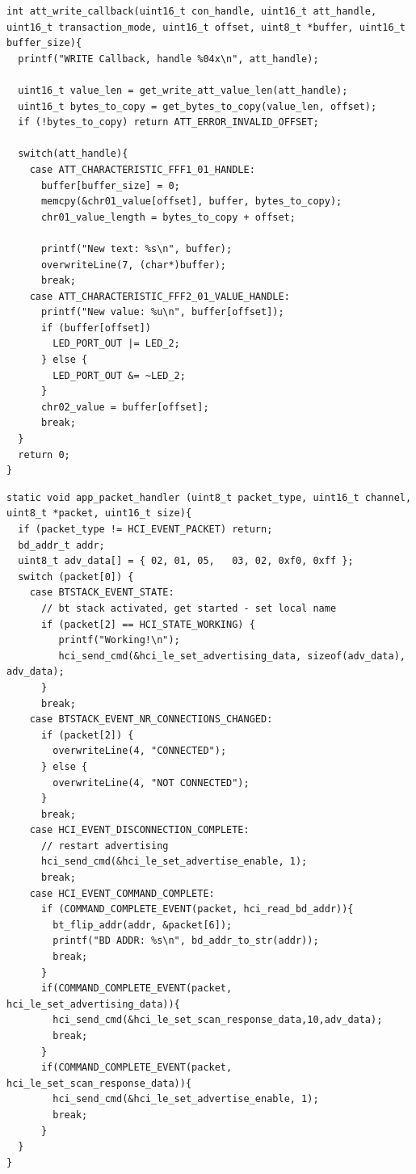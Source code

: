 \documentclass[a4paper,titlepage,oneside,12pt]{amsart} %
\begin{document}
\begin{lstlisting}[caption= Write callback ., label=code:lePeripheralWriteCallback]
int att_write_callback(uint16_t con_handle, uint16_t att_handle, uint16_t transaction_mode, uint16_t offset, uint8_t *buffer, uint16_t buffer_size){
  printf("WRITE Callback, handle %04x\n", att_handle);
  
  uint16_t value_len = get_write_att_value_len(att_handle);
  uint16_t bytes_to_copy = get_bytes_to_copy(value_len, offset);
  if (!bytes_to_copy) return ATT_ERROR_INVALID_OFFSET;
  
  switch(att_handle){
    case ATT_CHARACTERISTIC_FFF1_01_HANDLE:
      buffer[buffer_size] = 0;
      memcpy(&chr01_value[offset], buffer, bytes_to_copy);
      chr01_value_length = bytes_to_copy + offset;
      
      printf("New text: %s\n", buffer);
      overwriteLine(7, (char*)buffer);
      break;
    case ATT_CHARACTERISTIC_FFF2_01_VALUE_HANDLE:
      printf("New value: %u\n", buffer[offset]);
      if (buffer[offset])
        LED_PORT_OUT |= LED_2;
      } else {
        LED_PORT_OUT &= ~LED_2;
      }
      chr02_value = buffer[offset];
      break;
  }
  return 0;
}
\end{lstlisting}

\begin{lstlisting}[caption= Write callback ., label=code:lePeripheralATTPacketHandler]
static void app_packet_handler (uint8_t packet_type, uint16_t channel, uint8_t *packet, uint16_t size){
  if (packet_type != HCI_EVENT_PACKET) return;
  bd_addr_t addr;
  uint8_t adv_data[] = { 02, 01, 05,   03, 02, 0xf0, 0xff }; 
  switch (packet[0]) {
	case BTSTACK_EVENT_STATE:
	  // bt stack activated, get started - set local name
	  if (packet[2] == HCI_STATE_WORKING) {
         printf("Working!\n");
         hci_send_cmd(&hci_le_set_advertising_data, sizeof(adv_data), adv_data);
      }
      break;
    case BTSTACK_EVENT_NR_CONNECTIONS_CHANGED:
      if (packet[2]) {
        overwriteLine(4, "CONNECTED");
      } else {
        overwriteLine(4, "NOT CONNECTED");
      }
      break;
    case HCI_EVENT_DISCONNECTION_COMPLETE:
      // restart advertising
      hci_send_cmd(&hci_le_set_advertise_enable, 1);
      break;
    case HCI_EVENT_COMMAND_COMPLETE:
      if (COMMAND_COMPLETE_EVENT(packet, hci_read_bd_addr)){
        bt_flip_addr(addr, &packet[6]);
        printf("BD ADDR: %s\n", bd_addr_to_str(addr));
        break;
      }
      if(COMMAND_COMPLETE_EVENT(packet,   hci_le_set_advertising_data)){
        hci_send_cmd(&hci_le_set_scan_response_data,10,adv_data);
        break;
      }
      if(COMMAND_COMPLETE_EVENT(packet, hci_le_set_scan_response_data)){
        hci_send_cmd(&hci_le_set_advertise_enable, 1);
        break;
      }
  }
}
\end{lstlisting}
\end{document}
